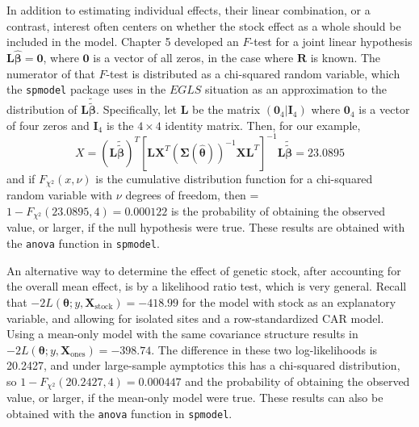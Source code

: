 \documentclass[12pt, titlepage]{article}
\begin{document}
In addition to estimating individual effects, their linear combination, or a contrast, interest often centers on whether the stock effect as a whole should be included in the model.  Chapter 5 developed an $F$-test for a joint linear hypothesis $\mathbf{L}\hat{\boldsymbol{\beta}} = \mathbf{0}$, where $\mathbf{0}$ is a vector of all zeros, in the case where $\mathbf{R}$ is known.  The numerator of that $F$-test is distributed as a chi-squared random variable, which the \texttt{spmodel} package uses  in the $EGLS$ situation as an approximation to the distribution of $\mathbf{L}\tilde{\tilde{\boldsymbol{\beta}}}$.  Specifically, let $\mathbf{L}$ be the matrix $(\mathbf{0}_{4}|\mathbf{I}_{4})$ where $\mathbf{0}_{4}$ is a vector of four zeros and $\mathbf{I}_{4}$ is the $4 \times 4$ identity matrix.  Then, for our example,
$$
X = (\mathbf{L}\tilde{\tilde{\boldsymbol{\beta}}})^{T}
[\mathbf{L}\mathbf{X}^{T}(\boldsymbol{\Sigma}(\hat{\boldsymbol{\theta}}))^{-1}\mathbf{X}\mathbf{L}^{T}]^{-1}\mathbf{L}\tilde{\tilde{\boldsymbol{\beta}}} = 23.0895
$$
and if $F_{\chi^{2}}(x,\nu)$ is the cumulative distribution function for a chi-squared random variable with $\nu$ degrees of freedom, then = $1 - F_{\chi^{2}}(23.0895,4) = 0.000122$ is the probability of obtaining the observed value, or larger, if the null hypothesis were true.  These results are obtained with the \texttt{anova} function in \texttt{spmodel}.

An alternative way to determine the effect of genetic stock, after accounting for the overall mean effect, is by a likelihood ratio test, which is very general.  Recall that $-2L(\boldsymbol{\theta};y,\mathbf{X}_{\textrm{stock}}) = -418.99$ for the model with stock as an explanatory variable, and allowing for isolated sites and a row-standardized CAR model. Using a mean-only model with the same covariance structure results in $-2L(\boldsymbol{\theta};y,\mathbf{X}_{\textrm{ones}}) = -398.74$. The difference in these two log-likelihoods is 20.2427, and under large-sample aymptotics this has a chi-squared distribution, so  $1 - F_{\chi^{2}}(20.2427,4) = 0.000447$ and the probability of obtaining the observed value, or larger, if the mean-only model were true.  These results can also be obtained with the \texttt{anova} function in \texttt{spmodel}.



%


%
%
\end{document}
